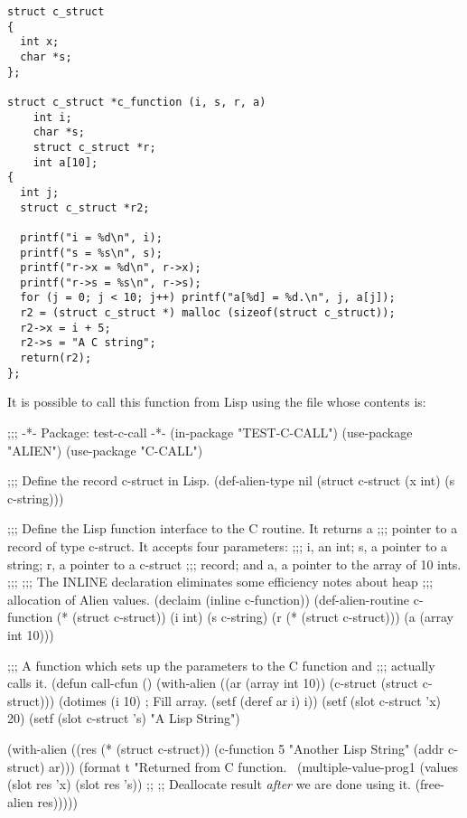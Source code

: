 \begin{verbatim}                
struct c_struct
{
  int x;
  char *s;
};
 
struct c_struct *c_function (i, s, r, a)
    int i;
    char *s;
    struct c_struct *r;
    int a[10];
{
  int j;
  struct c_struct *r2;
 
  printf("i = %d\n", i);
  printf("s = %s\n", s);
  printf("r->x = %d\n", r->x);
  printf("r->s = %s\n", r->s);
  for (j = 0; j < 10; j++) printf("a[%d] = %d.\n", j, a[j]);
  r2 = (struct c_struct *) malloc (sizeof(struct c_struct));
  r2->x = i + 5;
  r2->s = "A C string";
  return(r2);
};
\end{verbatim}

It is possible to call this function from Lisp using the file 
whose contents is:

\begin{lisp}
;;; -*- Package: test-c-call -*-
(in-package "TEST-C-CALL")
(use-package "ALIEN")
(use-package "C-CALL")

;;; Define the record c-struct in Lisp.
(def-alien-type nil
    (struct c-struct
            (x int)
            (s c-string)))

;;; Define the Lisp function interface to the C routine.  It returns a
;;; pointer to a record of type c-struct.  It accepts four parameters:
;;; i, an int; s, a pointer to a string; r, a pointer to a c-struct
;;; record; and a, a pointer to the array of 10 ints.
;;;
;;; The INLINE declaration eliminates some efficiency notes about heap
;;; allocation of Alien values.
(declaim (inline c-function))
(def-alien-routine c-function
    (* (struct c-struct))
  (i int)
  (s c-string)
  (r (* (struct c-struct)))
  (a (array int 10)))

;;; A function which sets up the parameters to the C function and
;;; actually calls it.
(defun call-cfun ()
  (with-alien ((ar (array int 10))
               (c-struct (struct c-struct)))
    (dotimes (i 10)                     ; Fill array.
      (setf (deref ar i) i))
    (setf (slot c-struct 'x) 20)
    (setf (slot c-struct 's) "A Lisp String")

    (with-alien ((res (* (struct c-struct))
                 (c-function 5 "Another Lisp String" (addr c-struct) ar)))
      (format t "Returned from C function.~%
      (multiple-value-prog1
          (values (slot res 'x)
                  (slot res 's))
        ;;              
        ;; Deallocate result {\em after} we are done using it.
        (free-alien res)))))
\end{lisp}


